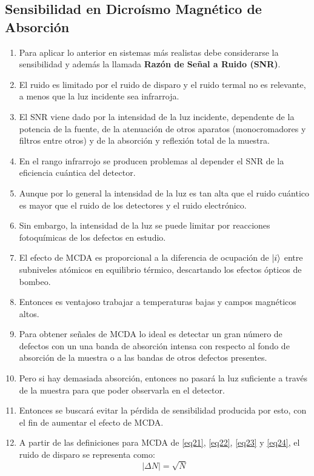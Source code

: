 \documentclass[aps,rmp,reprint,longbibliography]{revtex4-1}
\begin{document}
\subsection{Sensibilidad en Dicroísmo Magnético de Absorción}
\begin{enumerate}
\item Para aplicar lo anterior en sistemas más realistas debe considerarse la sensibilidad y además la llamada \textbf{Razón de Señal a Ruido (SNR)}. 
\item El ruido es limitado por el ruido de disparo y el ruido termal no es relevante, a menos que la luz incidente sea infrarroja.
\item El SNR viene dado por la intensidad de la luz incidente, dependente de la potencia de la fuente, de la atenuación de otros aparatos (monocromadores y filtros entre otros) y de la absorción y reflexión total de la muestra. 
\item En el rango infrarrojo se producen problemas al depender el SNR de la eficiencia cuántica del detector. 
\item Aunque por lo general la intensidad de la luz es tan alta que el ruido cuántico es mayor que el ruido de los detectores y el ruido electrónico. 
\item Sin embargo, la intensidad de la luz se puede limitar por reacciones fotoquímicas de los defectos en estudio.
\item El efecto de MCDA es proporcional a la diferencia de ocupación de $\ket{i}$ entre subniveles atómicos en equilibrio térmico, descartando los efectos ópticos de bombeo.
\item Entonces es ventajoso trabajar a temperaturas bajas y campos magnéticos altos. 
\item Para obtener señales de MCDA lo ideal es detectar un gran número de defectos con un una banda de absorción intensa con respecto al fondo de absorción de la muestra o a las bandas de otros defectos presentes. 
\item Pero si hay demasiada absorción, entonces no pasará la luz suficiente a través de la muestra para que poder observarla en el detector. 
\item Entonces se buscará evitar la pérdida de sensibilidad producida por esto, con el fin de aumentar el efecto de MCDA. 
\item  A partir de las definiciones para MCDA de \ref{eq21}, \ref{eq22}, \ref{eq23} y \ref{eq24}, el ruido de disparo se representa como:
\begin{equation}\label{eq40}\lvert\Delta N\rvert=\sqrt{N}\end{equation}

\end{enumerate}
\end{document}
